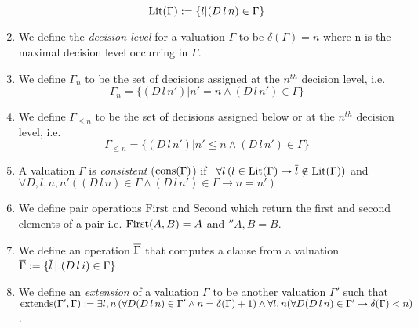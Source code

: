 \begin{mydef}
\begin{enumerate}
	 $$ \mathrm{Lit}(\Gamma) := \{l | (D \, l \, n) \in \Gamma\}$$
%
%
%
\item We define the \emph{decision level} for a valuation $\Gamma$ to be $\delta (\Gamma) = n$ where n is the maximal decision level occurring in $\Gamma$.
%
\item We define $\Gamma_{n}$ to be the set of  decisions assigned at the $n^{th}$ decision level, i.e. 
	$$\Gamma_{n} = \{(D \, l \, n') | n' = n  \wedge (D \, l \, n') \in \Gamma \}$$
%
\item We define $\Gamma_{\leq n}$ to be the set of decisions assigned below or at the $n^{th}$ decision level, i.e. 
	$$\Gamma_{\leq n} = \{( D \, l \, n') | n' \leq n \wedge (D \, l \, n') \in \Gamma \}$$
%
\item A valuation $\Gamma$ is \emph{consistent} ($\mathrm{cons}(\Gamma)$) if \, 
%
$\forall l \,( l \in \mathrm{Lit}(\Gamma) \to \overline{l} \notin \mathrm{Lit}(\Gamma))$
%
 and 
%
$\forall D,l,n,n'( (D \, l \, n) \in \Gamma \wedge (D \, l \, n') \in \Gamma \to n = n')$
%
%
%
\item We define pair operations $\mathrm{First}$ and $\mathrm{Second}$ which return the first and second elements of a pair i.e. $\mathrm{First}(A,B) = A$ and $\second{A,B} = B$.
%
\item We define an operation $\overline{\Gamma}$ that computes a clause from a valuation $\overline{\Gamma} := \{ \overline{l}\, | \, \, (D \, l \, i) \in \Gamma \}$.
%
\item We define an \emph{extension} of a valuation $\Gamma$ to be another valuation $\Gamma'$ such that $\mathrm{extends(\Gamma',\Gamma)} :=  \exists l,n \, ( \forall D (D \, l \, n) \in \Gamma' \wedge n  = \delta(\Gamma) + 1) \wedge \forall l,n ( \forall D (D \, l \, n) \in \Gamma' \to  \delta(\Gamma) < n)$.

\end{enumerate}
\end{mydef}
\hspace{1mm} \\

